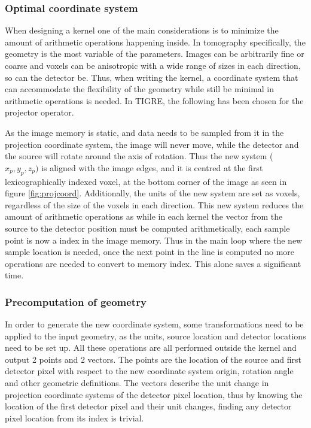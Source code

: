 \subsubsection{Optimal coordinate system}

When designing a kernel one of the main considerations is to minimize the amount of arithmetic operations happening inside. In tomography specifically, the geometry is the most variable of the parameters. Images can be arbitrarily fine or coarse and voxels can be anisotropic with a wide range of sizes in each direction, so can the detector be. Thus, when writing the kernel, a coordinate system that can accommodate the flexibility of the geometry while still be minimal in arithmetic operations is needed. In TIGRE, the following has been chosen for the projector operator.

As the image memory is static, and data needs to be sampled from it in the projection coordinate system, the image will never move, while the detector and the source will rotate around the axis of rotation. Thus the new system ($x_p,y_p,z_p)$ is aligned with the image edges, and it is centred at the first lexicographically indexed voxel, at the bottom corner of the image as seen in figure \ref{fig:projcoord}.  Additionally, the units of the new system are set as voxels, regardless of the size of the voxels in each direction. This new system reduces the amount of arithmetic operations as while in each kernel the vector from the source to the detector position must be computed arithmetically, each sample point is now a index in the image memory. Thus in the main loop where the new sample location is needed, once the next point in the line is computed no more operations are needed to convert to memory index. This alone saves a significant time.


\subsubsection{Precomputation of geometry}

In order to generate the new coordinate system, some transformations need to be applied to the input geometry, as the units, source location and detector locations need to be set up. All these operations are all performed outside the kernel and output 2 points and 2 vectors. The points are the location of the source and first detector pixel with respect to the new coordinate system origin, rotation angle and other geometric definitions. The vectors describe the unit change in projection coordinate systems of the detector pixel location, thus by knowing the location of the first detector pixel and their unit changes, finding any detector pixel location from its index is trivial.

